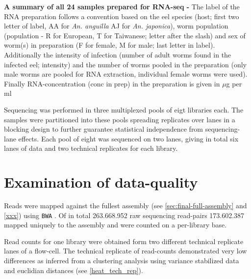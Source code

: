 \begin{table}[h]
\begin{center}
\caption[Summary of RNA preparation]{\textbf{A summary of all 24
    samples prepared for RNA-seq -} The label of the RNA preparation
  follows a convention based on the eel species (host; first two
  letter of label, AA for \textit{An. anguilla} AJ for
  \textit{An. japonica}), worm population (population - R for
  European, T for Taiwanese; letter after the slash) and sex of
  worm(s) in preparation (F for female, M for male; last letter in
  label). Additionally the intensity of infection (number of adult
  worms found in the infected eel; intensity) and the number of worms
  pooled in the preparation (only male worms are pooled for RNA
  extraction, individual female worms were used). Finally
  RNA-concentration (conc in prep) in the preparation is given in
  $\mu$g per ml}
\label{tab:lib-prep}
\end{center}
\end{table}

Sequencing was performed in three multiplexed pools of eigt libraries
each. The samples were partitioned into these pools spreading
replicates over lanes in a blocking design to further guarantee
statistical independence from sequencing-lane effects. Each pool of
eight was sequenced on two lanes, giving in total six lanes of data
and two technical replicates for each library.

\section{Examination of data-quality}

Reads were mapped against the fullest assembly (see
\ref{sec:final-full-assembly} and \ref{xxx}) using \texttt{BWA}
\cite{pmid20080505}. Of in total 263.668.952 raw sequencing read-pairs
173.602.387 mapped uniquely to the assembly and were counted on a
per-library base.

Read counts for one library were obtained form two different technical
replicate lanes of a flow-cell. The technical replicate of read-counts
demonstrated very low differences as inferred from a clustering
analysis using variance stabilized data and euclidian distances (see
\ref{heat_tech_rep}).


